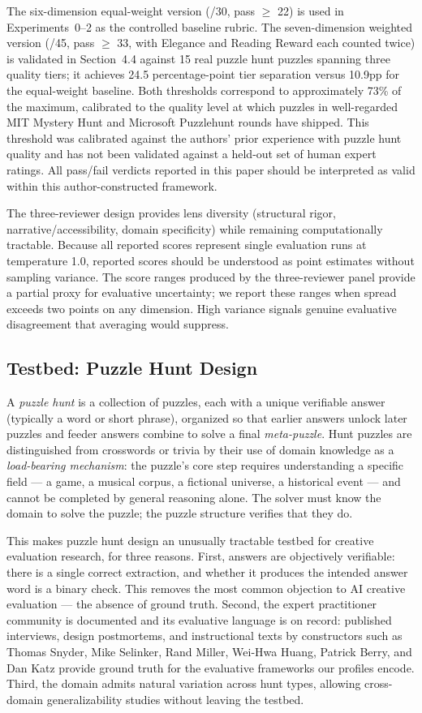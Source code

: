 The six-dimension equal-weight version (/30, pass $\geq$ 22) is used in Experiments~0--2 as the controlled baseline rubric. The seven-dimension weighted version (/45, pass $\geq$ 33, with Elegance and Reading Reward each counted twice) is validated in Section~4.4 against 15 real puzzle hunt puzzles spanning three quality tiers; it achieves 24.5 percentage-point tier separation versus 10.9pp for the equal-weight baseline. Both thresholds correspond to approximately 73\% of the maximum, calibrated to the quality level at which puzzles in well-regarded MIT Mystery Hunt and Microsoft Puzzlehunt rounds have shipped. This threshold was calibrated against the authors' prior experience with puzzle hunt quality and has not been validated against a held-out set of human expert ratings. All pass/fail verdicts reported in this paper should be interpreted as valid within this author-constructed framework.

The three-reviewer design provides lens diversity (structural rigor, narrative/accessibility, domain specificity) while remaining computationally tractable. Because all reported scores represent single evaluation runs at temperature 1.0, reported scores should be understood as point estimates without sampling variance. The score ranges produced by the three-reviewer panel provide a partial proxy for evaluative uncertainty; we report these ranges when spread exceeds two points on any dimension. High variance signals genuine evaluative disagreement that averaging would suppress.

\subsection{Testbed: Puzzle Hunt Design}

A \emph{puzzle hunt} is a collection of puzzles, each with a unique verifiable answer (typically a word or short phrase), organized so that earlier answers unlock later puzzles and feeder answers combine to solve a final \emph{meta-puzzle}. Hunt puzzles are distinguished from crosswords or trivia by their use of domain knowledge as a \emph{load-bearing mechanism}: the puzzle's core step requires understanding a specific field --- a game, a musical corpus, a fictional universe, a historical event --- and cannot be completed by general reasoning alone. The solver must know the domain to solve the puzzle; the puzzle structure verifies that they do.

This makes puzzle hunt design an unusually tractable testbed for creative evaluation research, for three reasons. First, answers are objectively verifiable: there is a single correct extraction, and whether it produces the intended answer word is a binary check. This removes the most common objection to AI creative evaluation --- the absence of ground truth. Second, the expert practitioner community is documented and its evaluative language is on record: published interviews, design postmortems, and instructional texts by constructors such as Thomas Snyder, Mike Selinker, Rand Miller, Wei-Hwa Huang, Patrick Berry, and Dan Katz provide ground truth for the evaluative frameworks our profiles encode. Third, the domain admits natural variation across hunt types, allowing cross-domain generalizability studies without leaving the testbed.

